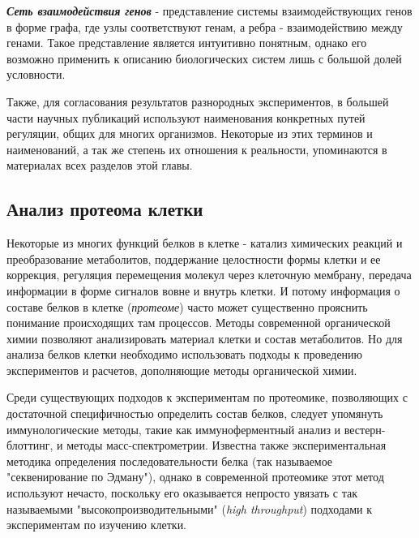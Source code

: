 \noindent
\textbf{ \textit{Сеть взаимодействия генов} } - представление системы взаимодействующих генов в форме графа, где узлы соответствуют генам, а ребра - взаимодействию между генами. Такое представление является интуитивно понятным, однако его возможно применить к описанию биологических систем лишь с большой долей условности.

Также, для согласования результатов разнородных экспериментов, в большей части научных публикаций используют наименования конкретных  путей регуляции, общих для многих организмов. Некоторые из этих терминов и наименований, а так же степень их отношения к реальности, упоминаются в материалах всех разделов этой главы.

\subsection{Анализ протеома клетки}  


Некоторые из многих функций белков в клетке - катализ химических реакций и преобразование метаболитов, поддержание целостности формы клетки и ее коррекция, регуляция перемещения молекул через клеточную мембрану, передача информации в форме сигналов вовне и внутрь клетки. И потому информация о составе белков в клетке (\textit{протеоме}) часто может существенно прояснить понимание происходящих там процессов. Методы современной органической химии позволяют анализировать материал клетки и состав метаболитов. Но для анализа белков клетки необходимо использовать подходы к проведению экспериментов и расчетов, дополняющие методы органической химии. 


Среди существующих подходов к экспериментам по протеомике, позволяющих с достаточной специфичностью определить состав белков, следует упомянуть иммунологические методы, такие как иммуноферментный анализ и вестерн-блоттинг, и методы масс-спектрометрии.
Известна также экспериментальная методика определения последовательности белка (так называемое "секвенирование по Эдману"), однако в современной протеомике этот метод используют нечасто, поскольку его оказывается непросто увязать с так называемыми "высокопроизводительными" (\textit{high throughput}) подходами к экспериментам по изучению клетки.

